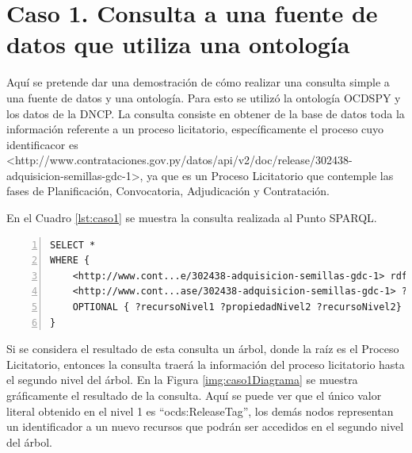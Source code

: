 \section{Caso 1. Consulta a una fuente de datos que utiliza una ontología}
\label{section:caso1}


Aquí se pretende dar una demostración de cómo realizar una consulta simple a una fuente de datos y una ontología. Para esto se utilizó la ontología OCDSPY y los datos de la DNCP. La consulta consiste en obtener de la base de datos toda la información referente a un proceso licitatorio, específicamente el proceso cuyo identificacor es <http://www.contrataciones.gov.py/datos/api/v2/doc/release/302438-adquisicion-semillas-gdc-1>, ya que es un Proceso Licitatorio que contemple las fases de Planificación, Convocatoria, Adjudicación y Contratación.

En el Cuadro \ref{lst:caso1} se muestra la consulta realizada al Punto SPARQL.

\noindent\begin{minipage}[t]{\textwidth}
\begin{lstlisting}[captionpos=b, caption={Triplas referentes al proceso licitatorio cuyo identificador es 302438}, label={lst:caso1},  numbers=left,  numberstyle=\tiny\color{mygray},frame=single]
SELECT *  
WHERE {    	
    <http://www.cont...e/302438-adquisicion-semillas-gdc-1> rdf:type ocds:Release .
    <http://www.cont...ase/302438-adquisicion-semillas-gdc-1> ?propiedadNivel1 ?recursoNivel1 .   
    OPTIONAL { ?recursoNivel1 ?propiedadNivel2 ?recursoNivel2}
}  
 \end{lstlisting}
\end{minipage}

 Si se considera el resultado de esta consulta un árbol, donde la raíz es el Proceso Licitatorio, entonces la consulta traerá la información del proceso licitatorio hasta el segundo nivel del árbol. En la Figura \ref{img:caso1Diagrama} se muestra gráficamente el resultado de la consulta. Aquí se puede ver que el único valor literal obtenido en el nivel 1 es “ocds:ReleaseTag”, los demás nodos representan un identificador a un nuevo recursos que podrán ser accedidos en el segundo nivel del árbol.
 
